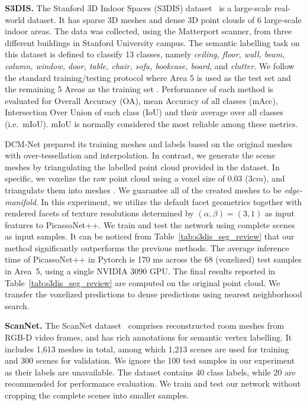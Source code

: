 \vspace{1mm}
\noindent\textbf{S3DIS.} The Stanford 3D Indoor Spaces (S3DIS) dataset~\cite{armeni20163d} is a large-scale real-world dataset. It has sparse 3D meshes and dense 3D point clouds of 6 large-scale indoor areas. The data was collected, using the Matterport scanner, from three different buildings in Stanford University campus. 
The semantic labelling task on this dataset is defined to classify 13  classes, namely \emph{ceiling, floor, wall, beam, column, window, door, table,
chair, sofa, bookcase, board}, and \emph{clutter}. We follow the standard training/testing protocol where Area 5 is used as the test set and the remaining 5 Areas as the training set \cite{landrieu2017large,li2018pointcnn,qi2017pointnet}. 
Performance of each method is evaluated  for Overall Accuracy (OA), mean  Accuracy of all classes (mAcc),   Intersection Over Union of each class (IoU) and their average over all classes (i.e.~mIoU). mIoU is normally considered the most reliable among these metrics. 

DCM-Net \cite{schult2020dualconvmesh} prepared its training meshes and labels based on the original meshes with over-tessellation and interpolation. In contrast, we generate the scene meshes by triangulating the labelled point cloud provided in the dataset.  In specific, we voxelize the raw point cloud using a voxel size of 0.03 (3$cm$), and triangulate them into meshes \cite{pointcloud2mesh}. We guarantee all of the created meshes to be \textit{edge-manifold}. In this experiment, we utilize the default facet geometrics together with rendered facets of texture resolutions determined by $(\alpha,\beta)=(3,1)$ as input features to PicassoNet++.
We train and test the network using complete scenes as input samples. It can be noticed from Table~\ref{tab:s3dis_seg_review} that 
our method significantly outperforms the previous methods. 
{\color{black}The average inference time of PicassoNet++ in Pytorch is 170 ms
across the 68 (voxelized) test samples in Area~5, using a single NVIDIA 3090 GPU.} The final results reported in Table~\ref{tab:s3dis_seg_review} are computed on the original point cloud. We transfer the voxelized predictions to dense predictions using nearest neighborhood search.

\vspace{2mm}
\noindent\textbf{ScanNet.}  The ScanNet dataset~\cite{dai2017scannet} comprises 
reconstructed room meshes from RGB-D video frames, and has rich annotations for semantic vertex labelling.
It includes 1,613 meshes in total, among which 1,213 scenes are used for training and 300 scenes for validation. We ignore the 100 test samples in our experiment as their labels are unavailable. The dataset contains 40 class labels, while 20 are recommended for performance evaluation. We train and test our network without cropping the complete scenes into smaller samples.

